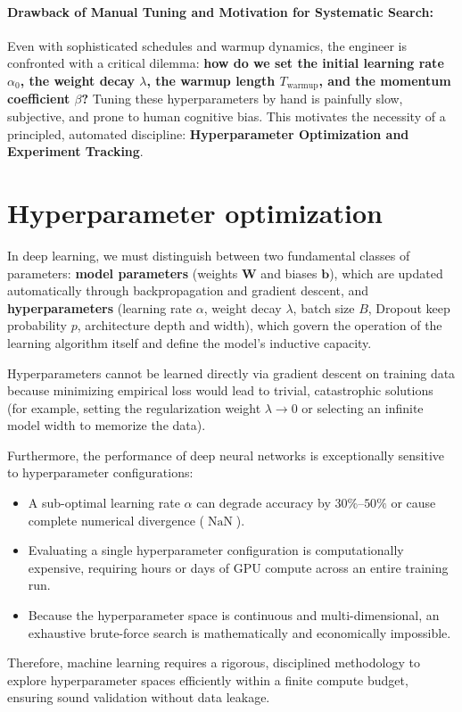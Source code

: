 \paragraph{Drawback of Manual Tuning and Motivation for Systematic Search:}
Even with sophisticated schedules and warmup dynamics, the engineer is confronted with a critical dilemma: \textbf{how do we set the initial learning rate $\alpha_0$, the weight decay $\lambda$, the warmup length $T_{\text{warmup}}$, and the momentum coefficient $\beta$?} Tuning these hyperparameters by hand is painfully slow, subjective, and prone to human cognitive bias. This motivates the necessity of a principled, automated discipline: \textbf{Hyperparameter Optimization and Experiment Tracking}.

\section{Hyperparameter optimization}
\label{sec:hyperparameter_optimization_sweeps}

In deep learning, we must distinguish between two fundamental classes of parameters: \textbf{model parameters} (weights $\mathbf{W}$ and biases $\mathbf{b}$), which are updated automatically through backpropagation and gradient descent, and \textbf{hyperparameters} (learning rate $\alpha$, weight decay $\lambda$, batch size $B$, Dropout keep probability $p$, architecture depth and width), which govern the operation of the learning algorithm itself and define the model's inductive capacity.

Hyperparameters cannot be learned directly via gradient descent on training data because minimizing empirical loss would lead to trivial, catastrophic solutions (for example, setting the regularization weight $\lambda \to 0$ or selecting an infinite model width to memorize the data). 

Furthermore, the performance of deep neural networks is exceptionally sensitive to hyperparameter configurations:
\begin{itemize}[noitemsep,topsep=2pt,parsep=0pt,partopsep=0pt]
  \item A sub-optimal learning rate $\alpha$ can degrade accuracy by $30\%\text{--}50\%$ or cause complete numerical divergence ($\operatorname{NaN}$).
  \item Evaluating a single hyperparameter configuration is computationally expensive, requiring hours or days of GPU compute across an entire training run.
  \item Because the hyperparameter space is continuous and multi-dimensional, an exhaustive brute-force search is mathematically and economically impossible.
\end{itemize}
Therefore, machine learning requires a rigorous, disciplined methodology to explore hyperparameter spaces efficiently within a finite compute budget, ensuring sound validation without data leakage.

